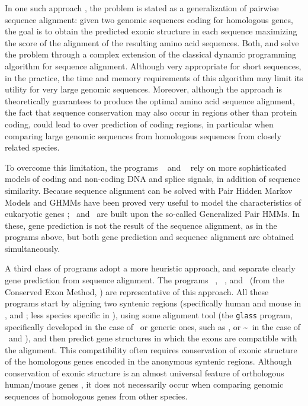 In one such approach \citep{bayo:2002a, pedersen:2002a}, the problem
is stated as a generalization of pairwise sequence alignment: given
two genomic sequences coding for homologous genes, the goal is to
obtain the predicted exonic structure in each sequence maximizing the
score of the alignment of the resulting amino acid sequences. Both,
\cite{bayo:2002a} and \cite{pedersen:2002a} solve the problem through
a complex extension of the classical dynamic programming algorithm for
sequence alignment. Although very appropriate for short sequences, in
the practice, the time and memory requirements of this algorithm may
limit its utility for very large genomic sequences.  Moreover,
although the approach is theoretically guarantees to produce the
optimal amino acid sequence alignment, the fact that sequence
conservation may also occur in regions other than protein coding,
could lead to over prediction of coding regions, in particular when
comparing large genomic sequences from homologous sequences from
closely related species.

To overcome this limitation, the programs \doublescan\ \citep{meyer:2002a} 
and \slam\ \citep{pachter:2003a} rely on more sophisticated models
of coding and non-coding DNA and splice signals, in addition of
sequence similarity. Because sequence alignment can be solved with
Pair Hidden Markov Models \citetext{PHMMs, \citealp{durbin:1998a}}
and GHMMs have been proved very useful to model the characteristics of
eukaryotic genes \citep{burge:1997a}; \slam\ and \doublescan\ are
built upon the so-called Generalized Pair HMMs. In these, gene
prediction is not the result of the sequence alignment, as in the
programs above, but both gene prediction and sequence alignment are
obtained simultaneously.

A third class of programs adopt a more heuristic approach, and
separate clearly gene prediction from sequence alignment.  The
programs \rosseta\ \citep{batzoglou:2000a}, \sgpo\ \citetext{from Syntenic
Gene Prediction, \citealp{wiehe:2001a}}, and \cem\ (from the Conserved
Exon Method, \citealp{bafna:2000a}) are representative of this
approach.  All these programs start by aligning two syntenic regions
(specifically human and mouse in \rosseta, and \cem; less species specific
in \sgpo), using some alignment tool (the \texttt{glass} program,
specifically developed in the case of \rosseta\, or generic ones, such as
\tbx, or \sim\ in the case of \cem\ and \sgpo), and then predict gene
structures in which the exons are compatible with the alignment. This
compatibility often requires conservation of exonic structure of the
homologous genes encoded in the anonymous syntenic regions. Although
conservation of exonic structure is an almost universal feature of
orthologous human/mouse genes \citep{mouse:2002a}, it does not
necessarily occur when comparing genomic sequences of homologous genes
from other species.
 
